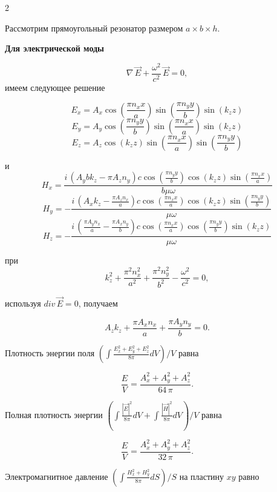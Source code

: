 \documentclass[twoside, 10pt]{article}
\begin{document}
\begin{multicols}{2}

\setcounter{equation}{0}
\renewcommand{\theequation}{B.\arabic{equation}}

    Рассмотрим прямоугольный резонатор размером \(a \times b \times h\).

    \textbf{Для электрической моды}

\begin{equation}\nabla\,\vec{E} + \frac{\omega^2}{c^2}\,\vec{E} = 0,\end{equation} имеем следующее решение

\[E_{x} = A_{x} \cos\left(\frac{\pi n_{x} x}{a}\right) \sin\left(\frac{\pi n_{y} y}{b}\right) \sin\left(k_{z} z\right)\]
\[E_{y} = A_{y} \cos\left(\frac{\pi n_{y} y}{b}\right) \sin\left(\frac{\pi n_{x} x}{a}\right) \sin\left(k_{z} z\right)\]
\[E_{z} = A_{z} \cos\left(k_{z} z\right) \sin\left(\frac{\pi n_{x} x}{a}\right) \sin\left(\frac{\pi n_{y} y}{b}\right)\]

и
\[H_{x} = \frac{i \, {\left(A_{y} b k_{z} - \pi A_{z} n_{y}\right)} c \cos\left(\frac{\pi n_{y} y}{b}\right) \cos\left(k_{z} z\right) \sin\left(\frac{\pi n_{x} x}{a}\right)}{b \mu \omega}\]
\[H_{y} = -\frac{i \, {\left(A_{x} k_{z} - \frac{\pi A_{z} n_{x}}{a}\right)} c \cos\left(\frac{\pi n_{x} x}{a}\right) \cos\left(k_{z} z\right) \sin\left(\frac{\pi n_{y} y}{b}\right)}{\mu \omega}\]
\[H_{z} = -\frac{i \, {\left(\frac{\pi A_{y} n_{x}}{a} - \frac{\pi A_{x} n_{y}}{b}\right)} c \cos\left(\frac{\pi n_{x} x}{a}\right) \cos\left(\frac{\pi n_{y} y}{b}\right) \sin\left(k_{z} z\right)}{\mu \omega}\]

при
\begin{equation}k_{z}^{2} + \frac{\pi^{2} n_{x}^{2}}{a^{2}} + \frac{\pi^{2} n_{y}^{2}}{b^{2}} - \frac{\omega^{2}}{c^{2}} = 0,\end{equation}

используя \(div\,\vec{E} = 0\), получаем

\begin{equation}A_{z} k_{z} + \frac{\pi A_{x} n_{x}}{a} + \frac{\pi A_{y} n_{y}}{b} = 0.\end{equation}

Плотность энергии поля
\(\left(\int \frac{E_x^2+E_y^2+E_z^2}{8 \pi}dV\right)\big/{V}\) равна

\begin{equation}\frac{E}{V} = \frac{{A_{x}^{2} + A_{y}^{2} + A_{z}^{2}} }{64 \, \pi}.\end{equation}

    Полная плотность энергии
\(\left(\int \frac{|\vec{E}|^2}{8 \pi}dV + \int \frac{|\vec{H}|^2}{8 \pi}dV\right)\big/{V}\) равна

\begin{equation}\frac{E}{V} = \frac{{A_{x}^{2} + A_{y}^{2} + A_{z}^{2}}}{32 \, \pi}.\end{equation}

    Электромагнитное давление
\(\left({\int \frac {H_x^2+H_y^2}{8 \pi} dS}\right)\big/{S}\) на пластину \(xy\) равно

\end{multicols}
\end{document}
